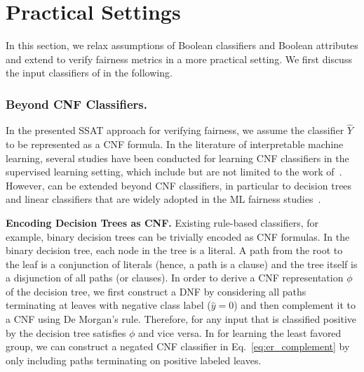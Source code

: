 \section{Practical Settings}
In this section, we  relax assumptions of Boolean classifiers and Boolean attributes and extend {\framework} to verify fairness metrics in a more practical setting. 
We first discuss the input classifiers of {\framework} in the following.

\subsubsection{Beyond CNF Classifiers.}
In the presented SSAT approach for verifying fairness, we assume the classifier $ \hat{Y} $ to be represented as a CNF formula.  In the literature of interpretable machine learning, several studies have been conducted for learning CNF classifiers in the supervised learning setting, which include but are not limited to the work of~\cite{angelino2017learning,malioutov2018mlic,ghosh19incremental,yu2020computing}.  However, {\framework} can be extended beyond CNF classifiers, in particular to decision trees and linear classifiers that are widely adopted in the ML fairness studies~\cite{zemel2013learning,zafar2017fairness,xu2019achieving,zhang2019faht,raff2018fair,friedler2019comparative}.

\textbf{Encoding Decision Trees as CNF.} Existing  rule-based classifiers, for example, binary decision trees  can be trivially encoded as  CNF formulas.  In the binary decision tree, each node in the tree is a literal. A path  from the root to the leaf is a conjunction of literals (hence, a path is a clause) and the tree itself is a disjunction of all paths (or  clauses). In order to derive a CNF representation $ \phi $ of the decision tree, we first construct a DNF by considering all paths terminating at leaves with negative class label ($ \hat{y} = 0 $) and then complement it to a CNF using De Morgan's rule. Therefore, for any input that is classified positive by the decision tree satisfies $ \phi $ and vice versa. In {\frameworklearn} for learning the least favored group, we can construct a negated CNF classifier in Eq.~\ref{eq:er_complement} by only including paths terminating on positive labeled leaves. 

